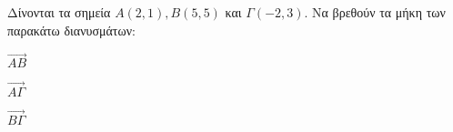 Δίνονται τα σημεία $ A(2,1),B(5,5) $ και $ \varGamma(-2,3) $.
Να βρεθούν τα μήκη των παρακάτω διανυσμάτων:
\begin{multicols}{3}
\begin{alist}
\item $\overrightarrow{AB}$ 
\item $\overrightarrow{A\varGamma} $
\item $\overrightarrow{B\varGamma}$
\end{alist}
\end{multicols}
